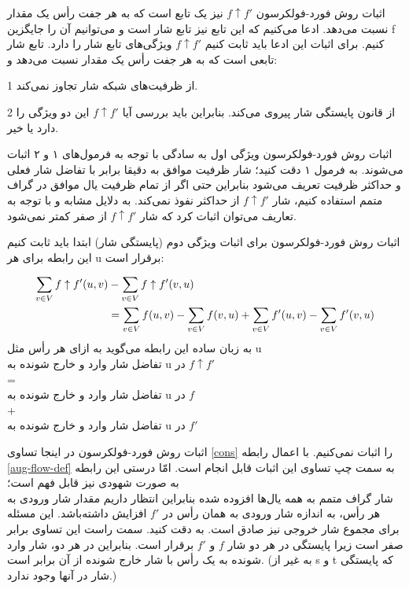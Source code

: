 \begin{itemframe}{اثبات روش فورد-فولکرسون}
\itm
$f \uparrow f'$
نیز یک تابع است که به هر جفت رأس یک مقدار نسبت می‌دهد. ادعا می‌کنیم که این تابع نیز تابع شار است و می‌توانیم آن را جایگزین f کنیم. برای اثبات این ادعا باید ثابت کنیم
$f \uparrow f'$
ویژگی‌های تابع شار را دارد. تابع شار تابعی است که به هر جفت رأس یک مقدار نسبت می‌دهد و:
\item[1]
از ظرفیت‌های شبکه شار تجاوز نمی‌کند.
\item[2]
از قانون پایستگی شار پیروی می‌کند.
\itm
بنابراین باید بررسی آیا
$f \uparrow f'$
این دو ویژگی را دارد یا خیر.
\end{itemframe}


\begin{itemframe}{اثبات روش فورد-فولکرسون}
\itm
ویژگی اول به سادگی با توجه به فرمول‌های ۱ و ۲ اثبات می‌شوند. به فرمول ۱ دقت کنید‍؛ شار ظرفیت موافق به دقیقا برابر با تفاضل شار فعلی و حداکثر ظرفیت تعریف می‌شود بنابراین حتی اگر از تمام ظرفیت یال موافق در گراف متمم استفاده کنیم، شار
$f \uparrow f'$
از حداکثر نفوذ نمی‌کند.
\itm
به دلایل مشابه و با توجه به تعاریف می‌توان اثبات کرد که شار
$f \uparrow f'$
از صفر کمتر نمی‌شود.
\end{itemframe}

\begin{itemframe}{اثبات روش فورد-فولکرسون}
\itm
برای اثبات ویژگی دوم (پایستگی شار) ابتدا باید ثابت کنیم این رابطه برای هر u برقرار است:

\begin{align}
\sum_{v\in V} f \uparrow f'(u, v)  & - \sum_{v\in V} f \uparrow f'(v, u) \notag \\
&=
 \sum_{v\in V} f(u, v) - \sum_{v\in V} f (v, u)
+
\sum_{v\in V} f'(u, v) - \sum_{v\in V} f'(v, u)
\label{cons}
\end{align}
\itm
به زبان ساده این رابطه می‌گوید به ازای هر رأس مثل u\\
تفاضل شار وارد و خارج شونده به u در
$ f \uparrow f'$ \\
=\\
تفاضل شار وارد و خارج شونده به u در
$f$ \\
+\\
تفاضل شار وارد و خارج شونده به u در
$f'$\\


\end{itemframe}

\begin{itemframe}{اثبات روش فورد-فولکرسون}
\itm
در اینجا تساوی \ref{cons} را اثبات نمی‌کنیم. با اعمال رابطه \ref{aug-flow-def} به سمت چپ تساوی این اثبات قابل انجام است. امّا درستی این رابطه به صورت شهودی نیز قابل فهم است؛
\\
شار گراف متمم به همه یال‌ها افزوده شده بنابراین انتظار داریم مقدار شار ورودی به هر رأس، به اندازه شار ورودی به همان رأس در
$f'$
افزایش داشته‌باشد. این مسئله برای مجموع شار خروجی نیز صادق است.
\itm
به
دقت کنید. سمت راست این تساوی برابر صفر است زیرا پایستگی در هر دو شار
$f$
و
$f'$
برقرار است. بنابراین در هر دو، شار وارد شونده به یک رأس با شار خارج شونده از آن برابر است. (به غیر از s و t که پایستگی شار در آنها وجود ندارد.)
\end{itemframe}

